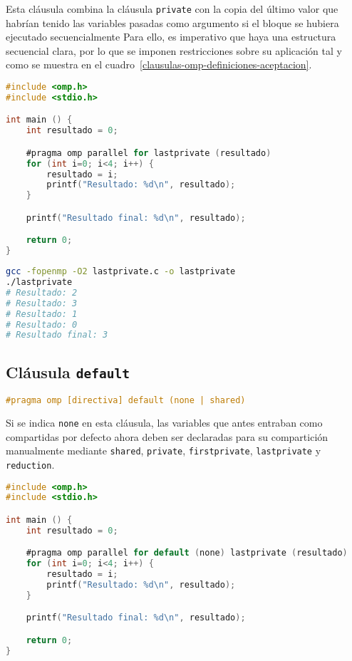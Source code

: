 Esta cláusula combina la cláusula \texttt{private} con la copia del último valor que habrían tenido las variables pasadas como argumento si el bloque se hubiera ejecutado secuencialmente
Para ello, es imperativo que haya una estructura secuencial clara, por lo que se imponen restricciones sobre su aplicación tal y como se muestra en el cuadro~\ref{clausulas-omp-definiciones-aceptacion}.

\begin{lstlisting}[language=C]
#include <omp.h>
#include <stdio.h>

int main () {
	int resultado = 0;

	#pragma omp parallel for lastprivate (resultado)
	for (int i=0; i<4; i++) {
		resultado = i;
		printf("Resultado: %d\n", resultado);
	}

	printf("Resultado final: %d\n", resultado);

	return 0;
}
\end{lstlisting}

\begin{lstlisting}[language=sh]
gcc -fopenmp -O2 lastprivate.c -o lastprivate
./lastprivate
# Resultado: 2
# Resultado: 3
# Resultado: 1
# Resultado: 0
# Resultado final: 3
\end{lstlisting}

\subsection{Cláusula \texttt{default}}

\begin{lstlisting}[language=C]
#pragma omp [directiva] default (none | shared)
\end{lstlisting}

Si se indica \texttt{none} en esta cláusula, las variables que antes entraban como compartidas por defecto ahora deben ser declaradas para su compartición manualmente mediante \texttt{shared}, \texttt{private}, \texttt{firstprivate}, \texttt{lastprivate} y \texttt{reduction}.

\begin{lstlisting}[language=C]
#include <omp.h>
#include <stdio.h>

int main () {
	int resultado = 0;

	#pragma omp parallel for default (none) lastprivate (resultado)
	for (int i=0; i<4; i++) {
		resultado = i;
		printf("Resultado: %d\n", resultado);
	}

	printf("Resultado final: %d\n", resultado);

	return 0;
}
\end{lstlisting}

